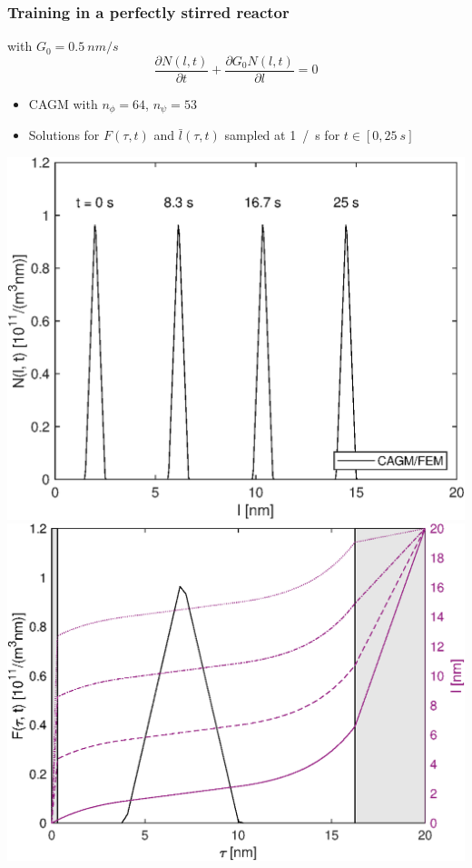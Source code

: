 \documentclass[10pt,xcolor=dvipsnames]{beamer}
\newcommand*{\itemskip}{0.25\baselineskip}
\begin{document}

\begin{frame}[t]

  \frametitle{Training in a perfectly stirred reactor}

   with $G_0 = \SI{0.5}{nm/s}$
  \begin{equation*}
    \frac{\partial N(l, t)}{\partial t} + \frac{\partial G_0 N(l, t)}{\partial l} = 0
  \end{equation*}

  \begin{itemize}
  \vspace{\itemskip}
  \item CAGM with $n_{\phi} = 64$, $n_{\psi} = 53$
  \vspace{\itemskip}
  \item Solutions for $F(\tau, t)$ and $\bar{l}(\tau, t)$ sampled at \SI{1}{/s} for $t \in [0, \SI{25}{s}]$
  \vspace{\itemskip}
  \end{itemize}

  \includegraphics[height=0.38\columnwidth,clip]{fig/pbe_pod_hat.eps}\hfill
  \includegraphics[height=0.38\columnwidth,clip]{fig/pbe_pod_psr_fl.eps}\\

\end{frame}
\end{document}

